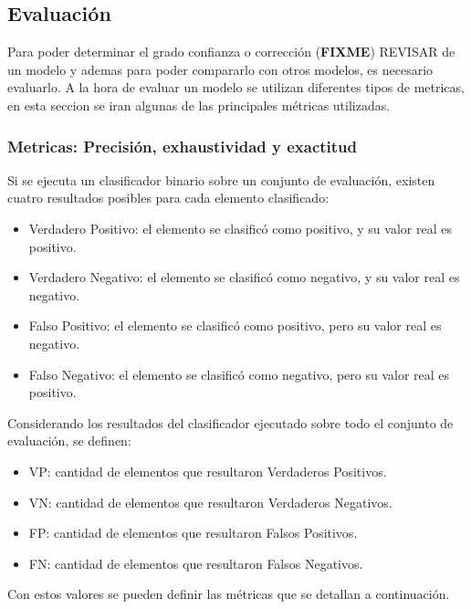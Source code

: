 \documentclass[a4paper,11pt,spanish]{book}
\newcommand*{\FIXME}[1]{{(\textbf{FIXME}) {#1}}}
\begin{document}
	  
      \subsection{Evaluación}
	Para poder determinar el grado confianza o corrección \FIXME{REVISAR} de un modelo y ademas para poder compararlo con otros modelos, es necesario evaluarlo. 
	A la hora de evaluar un modelo se utilizan diferentes tipos de metricas, en esta seccion se iran algunas de las principales métricas utilizadas.    

	\subsubsection {Metricas: Precisión, exhaustividad y exactitud}
	  Si se ejecuta un clasificador binario sobre un conjunto de evaluación, existen cuatro resultados posibles para cada elemento clasificado:
	  \begin{itemize}	
	    \item Verdadero Positivo: el elemento se clasificó como positivo, y su valor real es positivo.
	    \item Verdadero Negativo: el elemento se clasificó como negativo, y su valor real es negativo.
	    \item Falso Positivo: el elemento se clasificó como positivo, pero su valor real es negativo.
	    \item Falso Negativo: el elemento se clasificó como negativo, pero su valor real es positivo.
	  \end{itemize}
	  
	  Considerando los resultados del clasificador ejecutado sobre todo el conjunto de evaluación, se definen:
	  \begin{itemize}	
	    \item VP: cantidad de elementos que resultaron Verdaderos Positivos.
	    \item VN: cantidad de elementos que resultaron Verdaderos Negativos.
	    \item FP: cantidad de elementos que resultaron Falsos Positivos.
	    \item FN: cantidad de elementos que resultaron Falsos Negativos.
	  \end{itemize}	  
	  
	  Con estos valores se pueden definir las métricas que se detallan a continuación.
	  
\end{document}
